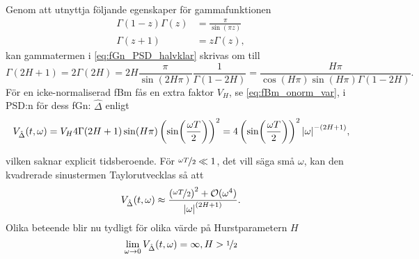 Genom att utnyttja följande egenskaper för gammafunktionen
\begin{align}
\Gamma(1-z)\Gamma(z)&=\frac{\pi}{\sin(\pi z)} \\
\Gamma(z+1)&=z\Gamma(z),
\end{align}
kan gammatermen i \eqref{eq:fGn_PSD_halvklar} skrivas om till
\begin{equation}
\Gamma(2H+1) 
= 2 \Gamma(2H) = 2H\frac{\pi}{\sin(2H\pi)}\frac{1}{\Gamma(1-2H)} 
= \frac{H\pi}{\cos(H\pi)\sin(H\pi)\Gamma(1-2H)}.
\end{equation}
För en icke-normaliserad fBm fås en extra faktor $V_H$, se \eqref{eq:fBm_onorm_var}, i PSD:n för dess fGn: $\hat{\Delta}$ enligt
\begin{equation}
V_{\hat{\Delta}}(t,\omega) 
= V_H 4\Gamma{(2H+1)}\sin(H\pi) \left( \sin(\frac{\omega T}{2}) \right) ^2 
= 4 \left( \sin(\frac{\omega T}{2}) \right) ^2\abs{\omega}^{-(2H+1)},
\end{equation}

vilken saknar explicit tidsberoende. För $\nicefrac{\omega T}{2} \ll 1$, det vill säga små $\omega$, kan den kvadrerade sinustermen Taylorutvecklas så att
\begin{equation}
    V_{\hat{\Delta}}(t,\omega) \approx \frac{ \left( \nicefrac{\omega T}{2} \right)^2 + \mathcal{O}(\omega^4) }{\abs{\omega}^{(2H+1)}}.
\end{equation}
Olika beteende blir nu tydligt för olika värde på Hurstparametern $H$ 
\begin{equation}
    \lim\limits_{\omega \to 0} V_{\hat{\Delta}}(t,\omega) = \infty, H>\nicefrac{1}{2}
\end{equation}






